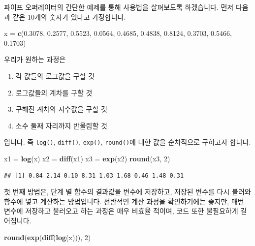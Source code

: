 \documentclass[12pt,]{book}
\newenvironment{Shaded}{\begin{snugshade}}{\end{snugshade}}
\newcommand{\DecValTok}[1]{\textcolor[rgb]{0.00,0.00,0.81}{#1}}
\newcommand{\FloatTok}[1]{\textcolor[rgb]{0.00,0.00,0.81}{#1}}
\newcommand{\KeywordTok}[1]{\textcolor[rgb]{0.13,0.29,0.53}{\textbf{#1}}}
\newcommand{\NormalTok}[1]{#1}
\newcommand{\StringTok}[1]{\textcolor[rgb]{0.31,0.60,0.02}{#1}}
\providecommand{\tightlist}{%
  \setlength{\itemsep}{0pt}\setlength{\parskip}{0pt}}
\begin{document}
파이프 오퍼레이터의 간단한 예제를 통해 사용법을 살펴보도록 하겠습니다. 먼저 다음과 같은 10개의 숫자가 있다고 가정합니다.

\begin{Shaded}
\begin{Highlighting}[]
\NormalTok{x =}\StringTok{ }\KeywordTok{c}\NormalTok{(}\FloatTok{0.3078}\NormalTok{, }\FloatTok{0.2577}\NormalTok{, }\FloatTok{0.5523}\NormalTok{, }\FloatTok{0.0564}\NormalTok{, }\FloatTok{0.4685}\NormalTok{,}
      \FloatTok{0.4838}\NormalTok{, }\FloatTok{0.8124}\NormalTok{, }\FloatTok{0.3703}\NormalTok{, }\FloatTok{0.5466}\NormalTok{, }\FloatTok{0.1703}\NormalTok{)}
\end{Highlighting}
\end{Shaded}

우리가 원하는 과정은

\begin{enumerate}
\def\labelenumi{\arabic{enumi}.}
\tightlist
\item
  각 값들의 로그값을 구할 것
\item
  로그값들의 계차를 구할 것
\item
  구해진 계차의 지수값을 구할 것
\item
  소수 둘째 자리까지 반올림할 것
\end{enumerate}

입니다. 즉 \texttt{log()}, \texttt{diff()}, \texttt{exp()}, \texttt{round()}에 대한 값을 순차적으로 구하고자 합니다.

\begin{Shaded}
\begin{Highlighting}[]
\NormalTok{x1 =}\StringTok{ }\KeywordTok{log}\NormalTok{(x)}
\NormalTok{x2 =}\StringTok{ }\KeywordTok{diff}\NormalTok{(x1)}
\NormalTok{x3 =}\StringTok{ }\KeywordTok{exp}\NormalTok{(x2)}
\KeywordTok{round}\NormalTok{(x3, }\DecValTok{2}\NormalTok{)}
\end{Highlighting}
\end{Shaded}

\begin{verbatim}
## [1] 0.84 2.14 0.10 8.31 1.03 1.68 0.46 1.48 0.31
\end{verbatim}

첫 번째 방법은, 단계 별 함수의 결과값을 변수에 저장하고, 저장된 변수를 다시 불러와 함수에 넣고 계산하는 방법입니다. 전반적인 계산 과정을 확인하기에는 좋지만, 매번 변수에 저장하고 불러오고 하는 과정은 매우 비효율 적이며, 코드 또한 불필요하게 길어집니다.

\begin{Shaded}
\begin{Highlighting}[]
\KeywordTok{round}\NormalTok{(}\KeywordTok{exp}\NormalTok{(}\KeywordTok{diff}\NormalTok{(}\KeywordTok{log}\NormalTok{(x))), }\DecValTok{2}\NormalTok{)}
\end{Highlighting}
\end{Shaded}
\end{document}
